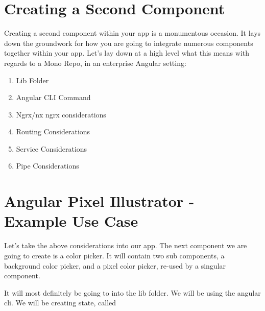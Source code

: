 \maketitle{}
\section{ Creating a Second Component }
Creating a second component within your app is a monumentous occasion. It lays
down the groundwork for how you are going to integrate numerous components
together within your app. Let's lay down at a high level what this means with
regards to a Mono Repo, in an enterprise Angular setting:

\begin{enumerate}
  \item Lib Folder
  \item Angular CLI Command
  \item Ngrx/nx ngrx considerations
  \item Routing Considerations
  \item Service Considerations
  \item Pipe Considerations
\end{enumerate}

\section{ Angular Pixel Illustrator - Example Use Case }
Let's take the above considerations into our app. The next component we are
going to create is a color picker. It will contain two sub components, a
background color picker, and a pixel color picker, re-used by a singular
component.

It will most definitely be going to into the lib folder. We will be using the
angular cli. We will be creating state, called 
